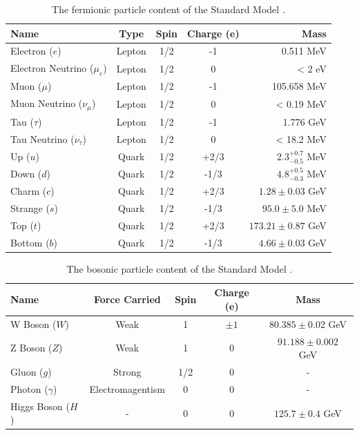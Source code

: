 \begin{table}[h!]
  \caption{The fermionic particle content of the Standard Model \cite{Agashe:2014kda}.\label{tab:sm_fermions}}
  \centering
  \small
  \begin{tabular}{ lcccr }
    \hline
    \hline
    Name        & Type & Spin & Charge (e) & Mass \\
    \hline
    Electron ($e$)              & Lepton    & 1/2    & -1     & 0.511 MeV  \\
    Electron Neutrino ($\mu_{e}$)& Lepton   & 1/2    & 0      & < 2 eV  \\
    Muon ($\mu$)                & Lepton    & 1/2    & -1     & 105.658 MeV  \\
    Muon Neutrino ($\nu_{\mu}$) & Lepton    & 1/2    & 0      & < 0.19 MeV \\
    Tau ($\tau$)                & Lepton    & 1/2    & -1     & 1.776 GeV  \\
    Tau Neutrino ($\nu_{\tau}$) & Lepton    & 1/2    & 0      & < 18.2 MeV \\
    Up ($u$)                    & Quark     & 1/2    & +2/3   & $2.3^{+0.7}_
    {-0.5}$ MeV \\
    Down ($d$)                  & Quark     & 1/2    & -1/3   & $4.8^{+0.5}_
    {-0.3}$ MeV \\
    Charm ($c$)                 & Quark     & 1/2    & +2/3   & $1.28 \pm
    0.03$ GeV \\
    Strange ($s$)               & Quark     & 1/2    & -1/3   & $95.0 \pm 5.0$ MeV\\
    Top ($t$)                   & Quark     & 1/2    & +2/3   & $173.21 \pm 0.87$ GeV \\
    Bottom ($b$)                & Quark     & 1/2    & -1/3   & $4.66 \pm 0.03$ GeV \\
    \hline
    \hline
  \end{tabular}
\end{table}

\begin{table}[h!]
  \caption{The bosonic particle content of the Standard Model \cite{Agashe:2014kda}.\label{tab:sm_bosons}}
  \centering
  \small
  \begin{tabular}{ lcccc }
    \hline
    \hline
    Name                            & Force Carried & Spin & Charge (e) & Mass \\
    \hline
    W Boson ($W$)     & Weak        & 1    & $\pm 1$  & $80.385 \pm 0.02$ GeV \\
    Z Boson ($Z$)     & Weak        & 1    & 0        & $91.188 \pm 0.002$ GeV \\
    Gluon ($g$)       & Strong      & 1/2  & 0        & - \\
    Photon ($\gamma$) & Electromagentism   & 0  & 0   & - \\
    Higgs Boson ($H$) & -           & 0    & 0        & $125.7 \pm 0.4$ GeV \\
    \hline
    \hline
  \end{tabular}
\end{table}

